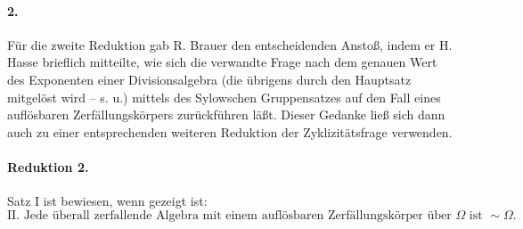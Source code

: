 \paragraph{2.}
Für die zweite Reduktion gab R. Brauer den entscheidenden Anstoß, indem er H. Hasse brieflich mitteilte, wie sich die verwandte Frage nach dem genauen Wert des Exponenten einer Divisionsalgebra (die übrigens durch den Hauptsatz mitgelöst wird -- s. u.) mittels des Sylowschen Gruppensatzes auf den Fall eines auflösbaren Zerfällungskörpers zurückführen läßt. Dieser Gedanke ließ sich dann auch zu einer entsprechenden weiteren Reduktion der Zyklizitätsfrage verwenden.

\paragraph{Reduktion 2.}
Satz I ist bewiesen, wenn gezeigt ist:
\[
\text{II. Jede überall zerfallende Algebra mit einem auflösbaren Zerfällungskörper über }\Omega\text{ ist }\sim\Omega .
\]

